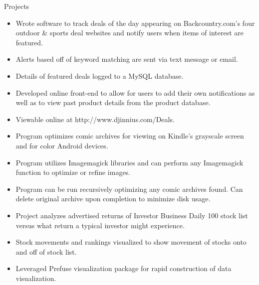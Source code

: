 \begin{category}{Projects}
\begin{itemize}
\item Wrote software to track deals of the day appearing on Backcountry.com's four outdoor \& sports deal websites and notify users when items of interest are featured.
\item Alerts based off of keyword matching are sent via text message or email.
\item Details of featured deals logged to a MySQL database. 
\item Developed online front-end to allow for users to add their own notifications as well as to view past product details from the product database.
\item Viewable online at http://www.djinnius.com/Deals.
\end{itemize}

\begin{itemize}
\item Program optimizes comic archives for viewing on Kindle's grayscale screen and for color Android devices.
\item Program utilizes Imagemagick libraries and can perform any Imagemagick function to optimize or refine images.
\item Program can be run recursively optimizing any comic archives found. Can delete original archive upon completion to minimize disk usage.
\end{itemize}
\begin{itemize}
\item Project analyzes advertised returns of Investor Business Daily 100 stock list versus what return a typical investor might experience.
\item Stock movements and rankings visualized to show movement of stocks onto and off of stock list.
\item Leveraged Prefuse visualization package for rapid construction of data visualization.
\end{itemize}

\end{category}
